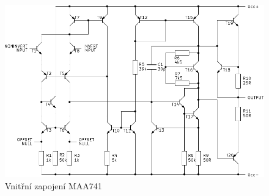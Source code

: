 		\begin{figure}[H]
		  \centering
		  \includegraphics[width=15cm]{../img/MAA741.pdf}
		  \caption{Vnitřní zapojení MAA741}
		  \label{sch:vz}
  	\end{figure}
   
  
